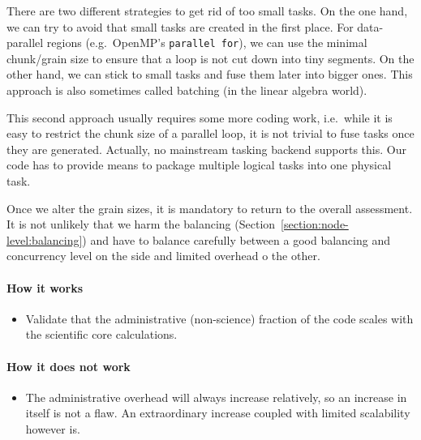 There are two different strategies to get rid of too small tasks.
On the one hand, we can try to avoid that small tasks are created in the first place.
For data-parallel regions (e.g.~OpenMP's \texttt{parallel for}), we can use the minimal chunk/grain size to ensure that a loop is not cut down into tiny segments.
On the other hand, we can stick to small tasks and fuse them later into bigger ones.
This approach is also sometimes called batching (in the linear algebra world).


This second approach usually requires some more coding work, i.e.~while it is easy to restrict the chunk size of a parallel loop, it is not trivial to fuse tasks once they are generated. 
Actually, no mainstream tasking backend supports this.
Our code has to provide means to package multiple logical tasks into one physical task.


Once we alter the grain sizes, it is mandatory to return to the overall assessment.
It is not unlikely that we harm the balancing (Section~\ref{section:node-level:balancing}) and have to balance carefully between a good balancing and concurrency level on the side and limited overhead o the other.


\paragraph*{How it works}

\begin{itemize}[noitemsep]
  \item[$\boxplus$] Validate that the administrative (non-science) fraction of the code scales with the scientific core calculations.
\end{itemize}


\paragraph*{How it does not work}

\begin{itemize}[noitemsep]
  \item[$\boxminus$] The administrative overhead will always increase relatively, so an increase in itself is not a flaw. An extraordinary increase coupled with limited scalability however is.
\end{itemize}
